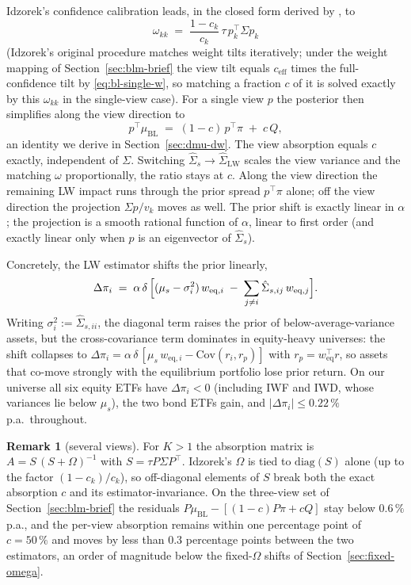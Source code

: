 \documentclass[a4paper,11pt]{article}
\theoremstyle{plain}
\theoremstyle{definition}
\newtheorem{remark}[proposition]{Remark}
\newcommand{\Om}{\Omega}
\newcommand{\muBL}{\mu_{\mathrm{BL}}}
\newcommand{\LW}{\mathrm{LW}}
\newcommand{\eff}{\mathrm{eff}}
\begin{document}
Idzorek's confidence calibration leads, in the closed form derived by
\citet{Walters2014}, to
\[
  \omega_{kk} \;=\; \frac{1-c_k}{c_k}\,\tau\,p_k^\top\Sigma p_k
\]
(Idzorek's original procedure matches weight tilts iteratively; under
the weight mapping of Section~\ref{sec:blm-brief} the view tilt equals
$c_{\eff}$ times the full-confidence tilt by \eqref{eq:bl-single-w}, so
matching a fraction $c$ of it is solved exactly by this $\omega_{kk}$
in the single-view case). For a single view $p$
the posterior then simplifies along the view direction to
\[
  p^\top\muBL \;=\; (1 - c)\,p^\top\pi \;+\; c\,Q,
\]
an identity we derive in Section~\ref{sec:dmu-dw}. The view absorption
equals $c$ exactly, independent of $\Sigma$. Switching
$\hat\Sigma_s \to \hat\Sigma_{\LW}$ scales the view variance and the
matching $\omega$ proportionally, the ratio stays at $c$. Along the view
direction the remaining LW impact runs through the prior spread
$p^\top\pi$ alone; off the view direction the projection
$\Sigma p / v_k$ moves as well. The prior shift is exactly linear in
$\alpha$; the projection is a smooth rational function of $\alpha$,
linear to first order (and exactly linear only when $p$ is an
eigenvector of $\hat\Sigma_s$).

Concretely, the LW estimator shifts the prior linearly,
\[
  \Delta\pi_i \;=\; \alpha\,\delta\,\Bigl[(\mu_s - \sigma_i^2)\,w_{\mathrm{eq},i}
        \;-\; \sum_{j\neq i}\hat\Sigma_{s,ij}\,w_{\mathrm{eq},j}\Bigr].
\]
Writing $\sigma_i^2 := \hat\Sigma_{s,ii}$, the diagonal term raises the
prior of below-average-variance assets, but the cross-covariance term
dominates in equity-heavy universes: the shift collapses to
$\Delta\pi_i = \alpha\,\delta\,[\mu_s\,w_{\mathrm{eq},i} -
\mathrm{Cov}(r_i, r_p)]$ with $r_p = w_{\mathrm{eq}}^\top r$, so assets
that co-move strongly with the equilibrium portfolio lose prior return.
On our universe all six equity ETFs have $\Delta\pi_i < 0$ (including
IWF and IWD, whose variances lie below $\mu_s$), the two bond ETFs
gain, and $|\Delta\pi_i| \leq 0.22\,\%$ p.a.\ throughout.

\begin{remark}[several views]\label{rem:multiview}
For $K > 1$ the absorption matrix is $A = S\,(S + \Om)^{-1}$ with
$S = \tau P\Sigma P^\top$. Idzorek's $\Omega$ is tied to
$\mathrm{diag}(S)$ alone (up to the factor $(1-c_k)/c_k$), so
off-diagonal elements of $S$ break both the exact
absorption $c$ and its estimator-invariance. On the three-view set of
Section~\ref{sec:blm-brief} the residuals
$P\muBL - [(1-c)P\pi + cQ]$ stay below $0.6\,\%$ p.a., and the per-view
absorption remains within one percentage point of $c = 50\,\%$ and moves
by less than $0.3$ percentage points between the two estimators, an
order of magnitude below the fixed-$\Omega$ shifts of
Section~\ref{sec:fixed-omega}.
\end{remark}
\end{document}
